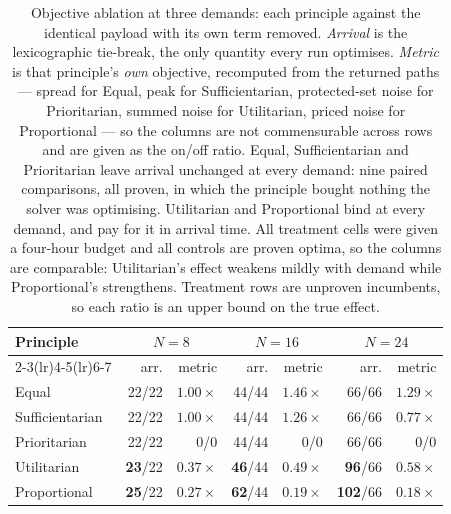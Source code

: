 \begin{table}[t]
\centering
\caption{Objective ablation at three demands: each principle against the identical payload with its own term removed. \emph{Arrival} is the lexicographic tie-break, the only quantity every run optimises. \emph{Metric} is that principle's \emph{own} objective, recomputed from the returned paths --- spread for Equal, peak for Sufficientarian, protected-set noise for Prioritarian, summed noise for Utilitarian, priced noise for Proportional --- so the columns are not commensurable across rows and are given as the on/off ratio. Equal, Sufficientarian and Prioritarian leave arrival unchanged at every demand: nine paired comparisons, all proven, in which the principle bought nothing the solver was optimising. Utilitarian and Proportional bind at every demand, and pay for it in arrival time. All treatment cells were given a four-hour budget and all controls are proven optima, so the columns are comparable: Utilitarian's effect weakens mildly with demand while Proportional's strengthens. Treatment rows are unproven incumbents, so each ratio is an upper bound on the true effect.}
\label{tab:ablation}
\begin{tabular}{l rr rr rr}
\toprule
\multirow{2}{*}{Principle} & \multicolumn{2}{c}{$N{=}8$} & \multicolumn{2}{c}{$N{=}16$} & \multicolumn{2}{c}{$N{=}24$} \\
\cmidrule(lr){2-3}\cmidrule(lr){4-5}\cmidrule(lr){6-7}
 & arr. & metric & arr. & metric & arr. & metric \\
\midrule
Equal & 22/22 & $1.00\times$ & 44/44 & $1.46\times$ & 66/66 & $1.29\times$ \\
Sufficientarian & 22/22 & $1.00\times$ & 44/44 & $1.26\times$ & 66/66 & $0.77\times$ \\
Prioritarian & 22/22 & 0/0 & 44/44 & 0/0 & 66/66 & 0/0 \\
Utilitarian & \textbf{23}/22 & $0.37\times$ & \textbf{46}/44 & $0.49\times$ & \textbf{96}/66 & $0.58\times$ \\
Proportional & \textbf{25}/22 & $0.27\times$ & \textbf{62}/44 & $0.19\times$ & \textbf{102}/66 & $0.18\times$ \\
\bottomrule
\end{tabular}
\end{table}
